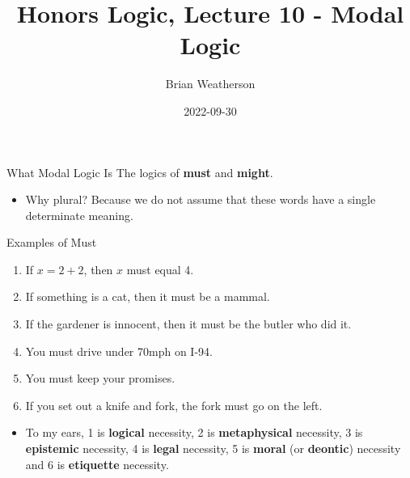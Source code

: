 \documentclass[
  14pt,
  letterpaper,
  ignorenonframetext,
  aspectratio=169,
  handout]{beamer}
\title{Honors Logic, Lecture 10 - Modal Logic}
\author{Brian Weatherson}
\date{2022-09-30}
\providecommand{\tightlist}{%
  \setlength{\itemsep}{0pt}\setlength{\parskip}{0pt}}\usepackage{longtable,booktabs,array}
\begin{document}
\frame{\titlepage}
\ifdefined\Shaded\renewenvironment{Shaded}{\begin{tcolorbox}[sharp corners, enhanced, boxrule=0pt, interior hidden, breakable, borderline west={3pt}{0pt}{shadecolor}, frame hidden]}{\end{tcolorbox}}\fi

\begin{frame}{What Modal Logic Is}
\protect\hypertarget{what-modal-logic-is}{}
The logics of \textbf{must} and \textbf{might}.

\begin{itemize}[<+->]
\tightlist
\item
  Why plural? Because we do not assume that these words have a single
  determinate meaning.
\end{itemize}
\end{frame}

\begin{frame}{Examples of Must}
\protect\hypertarget{examples-of-must}{}
\begin{enumerate}[<+->]
\tightlist
\item
  If \(x = 2 + 2\), then \(x\) must equal 4.
\item
  If something is a cat, then it must be a mammal.
\item
  If the gardener is innocent, then it must be the butler who did it.
\item
  You must drive under 70mph on I-94.
\item
  You must keep your promises.
\item
  If you set out a knife and fork, the fork must go on the left.
\end{enumerate}

\begin{itemize}[<+->]
\tightlist
\item
  To my ears, 1 is \textbf{logical} necessity, 2 is
  \textbf{metaphysical} necessity, 3 is \textbf{epistemic} necessity, 4
  is \textbf{legal} necessity, 5 is \textbf{moral} (or \textbf{deontic})
  necessity and 6 is \textbf{etiquette} necessity.
\end{itemize}
\end{frame}
\end{document}
